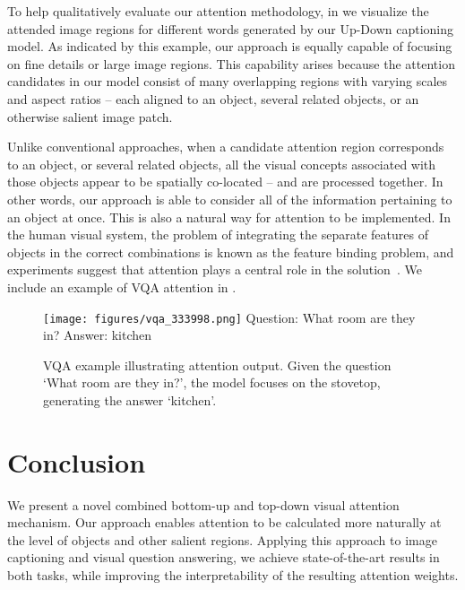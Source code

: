 \documentclass[10pt,twocolumn,letterpaper]{article}
\begin{document}
To help qualitatively evaluate our attention methodology, in  we visualize the attended image regions for different words generated by our Up-Down captioning model. As indicated by this example, our approach is equally capable of focusing on fine details or large image regions. This capability arises because the attention candidates in our model consist of many overlapping regions with varying scales and aspect ratios -- each aligned to an object, several related objects, or an otherwise salient image patch. 

Unlike conventional approaches, when a candidate attention region corresponds to an object, or several related objects, all the visual concepts associated with those objects appear to be spatially co-located -- and are processed together. In other words, our approach is able to consider all of the information pertaining to an object at once. This is also a natural way for attention to be implemented. In the human visual system, the problem of integrating the separate features of objects in the correct combinations is known as the feature binding problem, and experiments suggest that attention plays a central role in the solution~\cite{TreismanGelade80,treisman1982perceptual}. We include an example of VQA attention in .

\begin{figure}[t]
	\begin{center}
		\texttt{[image: figures/vqa\_333998.png]}
		Question: What room are they in?
		Answer: kitchen
	\end{center}
\caption{VQA example illustrating attention output. Given the question `What room are they in?', the model focuses on the stovetop, generating the answer `kitchen'. }
	\label{fig:vqa_example}
\end{figure}



\section{Conclusion}

We present a novel combined bottom-up and top-down visual attention mechanism. Our approach enables attention to be calculated more naturally at the level of objects and other salient regions. Applying this approach to image captioning and visual question answering, we achieve state-of-the-art results in both tasks, while improving the interpretability of the resulting attention weights. 
\end{document}
